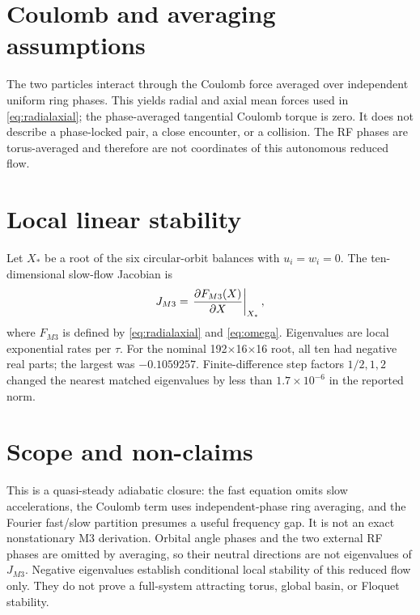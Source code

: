 \documentclass[11pt]{article}
\begin{document}
\section{Coulomb and averaging assumptions}
The two particles interact through the Coulomb force averaged over independent
uniform ring phases. This yields radial and axial mean forces used in
\eqref{eq:radialaxial}; the phase-averaged tangential Coulomb torque is zero.
It does not describe a phase-locked pair, a close encounter, or a collision.
The RF phases are torus-averaged and therefore are not coordinates of this
autonomous reduced flow.

\section{Local linear stability}
Let $X_*$ be a root of the six circular-orbit balances with $u_i=w_i=0$.
The ten-dimensional slow-flow Jacobian is
\begin{equation}
 J_{M3}=\left.{\partial F_{M3}(X)\over\partial X}\right|_{X_*},
\end{equation}
where $F_{M3}$ is defined by \eqref{eq:radialaxial} and \eqref{eq:omega}.
Eigenvalues are local exponential rates per $\tau$. For the nominal
192$\times$16$\times$16 root, all ten had negative real parts; the largest
was $-0.1059257$. Finite-difference step factors $1/2,1,2$ changed the nearest
matched eigenvalues by less than $1.7\times10^{-6}$ in the reported norm.

\section{Scope and non-claims}
This is a quasi-steady adiabatic closure: the fast equation omits slow
accelerations, the Coulomb term uses independent-phase ring averaging, and the
Fourier fast/slow partition presumes a useful frequency gap. It is not an exact
nonstationary M3 derivation. Orbital angle phases and the two external RF phases
are omitted by averaging, so their neutral directions are not eigenvalues of
$J_{M3}$. Negative eigenvalues establish conditional local stability of this
reduced flow only. They do not prove a full-system attracting torus, global
basin, or Floquet stability.
\end{document}
